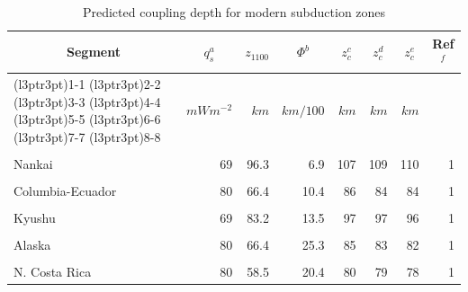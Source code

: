 \documentclass[draft,linenumbers]{agujournal2018} %
\providecommand{\DIFaddbegin}{} %
\providecommand{\DIFdelend}{} %
\newcommand{\DIFaddincludegraphics}[2][]{{\color{blue}\fbox{\DIFOincludegraphics[#1]{#2}}}} %
\DeclareRobustCommand{\DIFaddbegin}{\DIFOaddbegin \let\includegraphics\DIFaddincludegraphics} %
\DeclareRobustCommand{\DIFdelend}{\DIFOaddend \let\includegraphics\DIFOincludegraphics} %
\begin{document}
\DIFdelend \DIFaddbegin \begin{table}

\caption{\label{tab:segs}Predicted coupling depth for modern subduction zones}
\centering
\fontsize{8}{10}\selectfont
\begin{tabular}[t]{lrrrrrrr}
\toprule
\multicolumn{1}{c}{Segment} & \multicolumn{1}{c}{$q_s^a$} & \multicolumn{1}{c}{$z_{1100}$} & \multicolumn{1}{c}{$\Phi^b$} & \multicolumn{1}{c}{$z_c^c$} & \multicolumn{1}{c}{$z_c^d$} & \multicolumn{1}{c}{$z_c^e$} & \multicolumn{1}{c}{Ref$^f$} \\
\cmidrule(l{3pt}r{3pt}){1-1} \cmidrule(l{3pt}r{3pt}){2-2} \cmidrule(l{3pt}r{3pt}){3-3} \cmidrule(l{3pt}r{3pt}){4-4} \cmidrule(l{3pt}r{3pt}){5-5} \cmidrule(l{3pt}r{3pt}){6-6} \cmidrule(l{3pt}r{3pt}){7-7} \cmidrule(l{3pt}r{3pt}){8-8}
 & $mWm^{-2}$ & $km$ & $km/100$ & $km$ & $km$ & $km$ & \\
\midrule
\cellcolor{gray!6}{N. Cascadia} & \cellcolor{gray!6}{75} & \cellcolor{gray!6}{74.2} & \cellcolor{gray!6}{3.4} & \cellcolor{gray!6}{92} & \cellcolor{gray!6}{91} & \cellcolor{gray!6}{90} & \cellcolor{gray!6}{1}\\
Nankai & 69 & 96.3 & 6.9 & 107 & 109 & 110 & 1\\
\cellcolor{gray!6}{Mexico} & \cellcolor{gray!6}{72} & \cellcolor{gray!6}{98.1} & \cellcolor{gray!6}{7.2} & \cellcolor{gray!6}{108} & \cellcolor{gray!6}{111} & \cellcolor{gray!6}{112} & \cellcolor{gray!6}{1}\\
Columbia-Ecuador & 80 & 66.4 & 10.4 & 86 & 84 & 84 & 1\\
\cellcolor{gray!6}{S.C. Chile} & \cellcolor{gray!6}{80} & \cellcolor{gray!6}{66.4} & \cellcolor{gray!6}{20.0} & \cellcolor{gray!6}{85} & \cellcolor{gray!6}{84} & \cellcolor{gray!6}{83} & \cellcolor{gray!6}{1}\\
\addlinespace
Kyushu & 69 & 83.2 & 13.5 & 97 & 97 & 96 & 1\\
\cellcolor{gray!6}{N. Sumatra} & \cellcolor{gray!6}{120} & \cellcolor{gray!6}{26.8} & \cellcolor{gray!6}{25.0} & \cellcolor{gray!6}{57} & \cellcolor{gray!6}{65} & \cellcolor{gray!6}{68} & \cellcolor{gray!6}{2}\\
Alaska & 80 & 66.4 & 25.3 & 85 & 83 & 82 & 1\\
\cellcolor{gray!6}{N. Chile} & \cellcolor{gray!6}{85} & \cellcolor{gray!6}{58.7} & \cellcolor{gray!6}{38.4} & \cellcolor{gray!6}{78} & \cellcolor{gray!6}{77} & \cellcolor{gray!6}{77} & \cellcolor{gray!6}{1}\\
N. Costa Rica & 80 & 58.5 & 20.4 & 80 & 79 & 78 & 1\\

\end{tabular}
\end{table}
\end{document}
